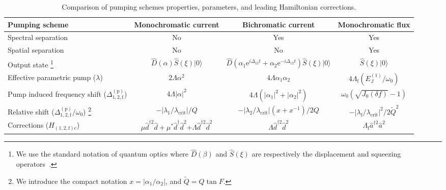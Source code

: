 \documentclass[pra,twocolumn,superscriptaddress]{revtex4-1}
\newcommand{\ah}[0]{\hat{a}}
\newcommand{\dhat}[0]{\hat{d}}
\newcommand{\lcrit}[0]{\lambda_{\mathrm{crit}}}
\newcommand{\lsp}[0]{\lambda_{\mathrm{1}}}
\newcommand{\ldp}[0]{\lambda_{\mathrm{2}}}
\newcommand{\lfp}[0]{\lambda_{\mathrm{f}}}
\newcommand{\df}[0]{\delta\!f}
\newcommand{\parO}[1]{\left(#1\right)}
\newcommand{\abs}[1]{\left|#1\right|}
\newcommand{\ket}[1]{|{#1}\rangle}
\newcommand{\erm}[0]{\mathrm{e}}
\begin{document}
\begin{table*}[tb]
	\caption{Comparison of pumping schemes properties, parameters, and leading Hamiltonian corrections.
	}
	\label{tab:comparingPumpingSchemes}
	\centering
	\begin{center}
	\begin{ruledtabular}
	\begin{tabular}{lccc}
		Pumping scheme
		 & Monochromatic  current
		 & Bichromatic  current  
		 & Monochromatic  flux  \\ \hline
	 Spectral separation & No & Yes & Yes  \\ 
	 Spatial separation & No & No & Yes  \\ 
	 Output state 
	 \footnote{
	 	We use the standard notation of quantum optics where $\hat D(\beta)$ and $\hat S(\xi)$ are respectively the displacement and squeezing operators~\cite{Barnett:1997fk}.
	 }
	 & 
	 $\hat D(\alpha)\hat S(\xi)\ket{0}$
	 & 
	 $\hat D(
	 \alpha_1 \erm^{i \Delta_{12}t}
	 +
	 \alpha_2 \erm^{-i \Delta_{12}t}
	 )
	 \hat S(\xi)\ket{0}$
	 &
	 $\hat S(\xi)\ket{0}$
	  \\ \hline
	 Effective parametric pump ($\lambda$)
	 	 & $2 \Lambda \alpha^2 $
	 	 & $4 \Lambda \alpha_1 \alpha_2$
	 	 & $4 \Lambda_{\mathrm{f}} \parO{E_J^{(1)}/ \omega_0}$
	 	  \\ 
	 Pump induced frequency shift ($\Delta^{\mathrm{(p)}}_{1,2,\mathrm{f}}$)
	 &
	 $4 \Lambda \abs{\alpha}^2 $
	 &
	 $4  \Lambda \parO{\abs{\alpha_1}^2+ \abs{\alpha_2}^2}$
	 &
	 $\omega_0 \parO{\sqrt{J_0(\df)}-1}$
	 \\ 
	 Relative shift ($\Delta^{\mathrm{(p)}}_{1,2,\mathrm{f}}/\omega_0$)
	 \footnote{
	 We introduce the compact notation
	 	$x = \abs{\alpha_1/\alpha_2}$, and $\tilde{Q} = Q \tan F $.
	 }
	 &
	 $ -\abs{\lsp/ \lcrit}/Q $
	 &
	 $ -\abs{\ldp/ \lcrit}\parO{x + x^{-1}}/2Q $
	 &
	 $-\abs{\lfp/ \lcrit}^2/2\tilde{Q}^2$
	\\
	 Corrections ($H_{(1,2,\mathrm{f})\mathrm{c}}$)& 
	 $\mu \dhat^{\dag 2}\dhat +\mu^* \dhat^{\dag }\dhat^2 $$+ \Lambda \dhat^{\dag 2}\dhat^2$  
	 & 
	$\Lambda \dhat^{\dag 2}\dhat^2$ & $\Lambda_{\mathrm{f}} \ah^{\dag 2}\ah^2$ 
% 
	\end{tabular}
	\end{ruledtabular}
	\end{center}
\end{table*}
\end{document}

